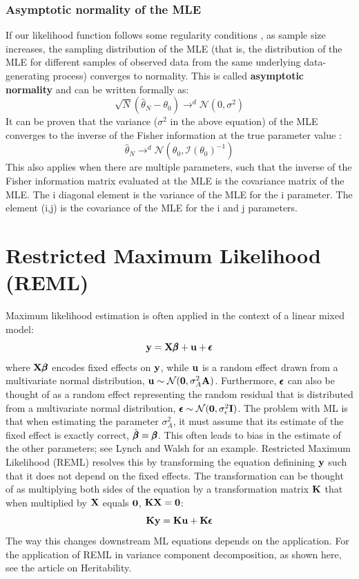 \documentclass[12pt]{article}
\begin{document}
\subsubsection{Asymptotic normality of the MLE}
If our likelihood function follows some regularity conditions \citep{wikipedia2026webFisherInfo}, as sample size increases, the sampling distribution of the MLE (that is, the distribution of the MLE for different samples of observed data from the same underlying data-generating process) converges to normality. This is called \textbf{asymptotic normality} and can be written formally as:
$$
\sqrt{N}
(\hat{\theta}_N - \theta_0)
\rightarrow^d
\mathcal{N}(0, \sigma^2)
$$
It can be proven that the variance ($\sigma^2$ in the above equation) of the MLE converges to the inverse of the Fisher information at the true parameter value \citep{gundersen2019web}:
$$
\hat{\theta}_N
\rightarrow^d
\mathcal{N}(\theta_0, \mathcal{I}(\theta_0)^{-1})
$$
This also applies when there are multiple parameters, such that the inverse of the Fisher information matrix evaluated at the MLE is the covariance matrix of the MLE.
The i diagonal element is the variance of the MLE for the i parameter.
The element (i,j) is the covariance of the MLE for the i and j parameters.

\section{Restricted Maximum Likelihood (REML)}
Maximum likelihood estimation is often applied in the context of a linear mixed model:
$$
\mathbf{y} = \mathbf{X} \pmb{\beta} + \mathbf{u} + \pmb{\epsilon}
$$
where $\mathbf{X} \pmb{\beta}$ encodes fixed effects on $\mathbf{y}$, while $\mathbf{u}$ is a random effect drawn from a multivariate normal distribution, $\mathbf{u} \sim \mathcal{N}(\textbf{0}, \sigma_A^2 \mathbf{A})$. Furthermore, $\pmb{\epsilon}$ can also be thought of as a random effect representing the random residual that is distributed from a multivariate normal distribution, $\pmb{\epsilon} \sim \mathcal{N}(\textbf{0}, \sigma_{\epsilon}^2 \mathbf{I})$. The problem with ML is that when estimating the parameter $\sigma_A^2$, it must assume that its estimate of the fixed effect is exactly correct, $\hat{\pmb{\beta}} = \pmb{\beta}$. This often leads to bias in the estimate of the other parameters; see Lynch and Walsh \citep[pg. 781]{lynch1998book} for an example. Restricted Maximum Likelihood (REML) resolves this by transforming the equation definining $\mathbf{y}$ such that it does not depend on the fixed effects. The transformation can be thought of as multiplying both sides of the equation by a transformation matrix $\mathbf{K}$ that when multiplied by $\mathbf{X}$ equals $\textbf{0}$, $\mathbf{K} \mathbf{X} = \textbf{0}$:
$$
\mathbf{K} \mathbf{y} = \mathbf{K} \mathbf{u} + \mathbf{K} \pmb{\epsilon}
$$
The way this changes downstream ML equations depends on the application. For the application of REML in variance component decomposition, as shown here, see the article on Heritability.
\end{document}
